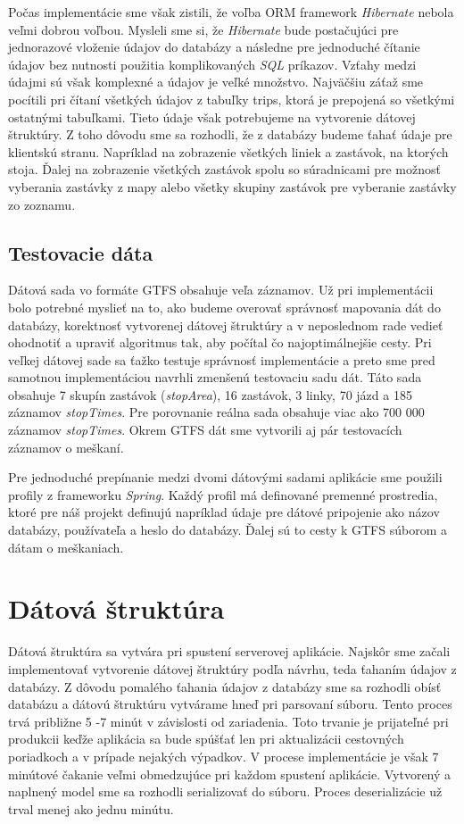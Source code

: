 Počas implementácie sme však zistili, že voľba ORM framework \textit{Hibernate} nebola veľmi dobrou voľbou. Mysleli sme si, že \textit{Hibernate} bude postačujúci pre jednorazové vloženie údajov do databázy a následne pre jednoduché čítanie údajov bez nutnosti použitia komplikovaných \textit{SQL} príkazov. Vzťahy medzi údajmi sú však komplexné a údajov je veľké množstvo. Najväčšiu záťaž sme pocítili pri čítaní všetkých údajov z tabuľky trips, ktorá je prepojená so všetkými ostatnými tabuľkami. Tieto údaje však potrebujeme na vytvorenie dátovej štruktúry. Z toho dôvodu sme sa rozhodli, že z databázy budeme ťahať údaje pre klientskú stranu. Napríklad na zobrazenie všetkých liniek a zastávok, na ktorých stoja. Ďalej na zobrazenie všetkých zastávok spolu so súradnicami pre možnosť vyberania zastávky z mapy alebo všetky skupiny zastávok pre vyberanie zastávky zo zoznamu.

\subsection{Testovacie dáta}
Dátová sada vo formáte GTFS obsahuje veľa záznamov. Už pri implementácii bolo potrebné myslieť na to, ako budeme overovať správnosť mapovania dát do databázy, korektnosť vytvorenej dátovej štruktúry a v neposlednom rade vedieť ohodnotiť a upraviť algoritmus tak, aby počítal čo najoptimálnejšie cesty. Pri veľkej dátovej sade sa ťažko testuje správnosť implementácie a preto sme pred samotnou implementáciou navrhli zmenšenú testovaciu sadu dát. 
Táto sada obsahuje 7 skupín zastávok (\textit{stopArea}), 16 zastávok, 3 linky, 70 jázd a 185 záznamov \textit{stopTimes}. Pre porovnanie reálna sada obsahuje viac ako 700 000 záznamov \textit{stopTimes}. Okrem GTFS dát sme vytvorili aj pár testovacích záznamov o meškaní. 

Pre jednoduché prepínanie medzi dvomi dátovými sadami aplikácie sme použili profily z frameworku \textit{Spring}. Každý profil má definované premenné prostredia, ktoré pre náš projekt definujú napríklad údaje pre dátové pripojenie ako názov databázy, používateľa a heslo do databázy. Ďalej sú to cesty k GTFS súborom a dátam o meškaniach. 

\section{Dátová štruktúra}
Dátová štruktúra sa vytvára pri spustení serverovej aplikácie. Najskôr sme začali implementovať vytvorenie dátovej štruktúry podľa návrhu, teda ťahaním údajov z databázy. Z dôvodu pomalého ťahania údajov z databázy sme sa rozhodli obísť databázu a dátovú štruktúru vytvárame hneď pri parsovaní súboru. Tento proces trvá približne 5 -7 minút v závislosti od zariadenia. Toto trvanie je prijateľné pri produkcii keďže aplikácia sa bude spúšťať len pri aktualizácii cestovných poriadkoch a v prípade nejakých výpadkov. V procese implementácie je však 7 minútové čakanie veľmi obmedzujúce pri každom spustení aplikácie. Vytvorený a naplnený model sme sa rozhodli serializovať do súboru. Proces deserializácie už trval menej ako jednu minútu. 

